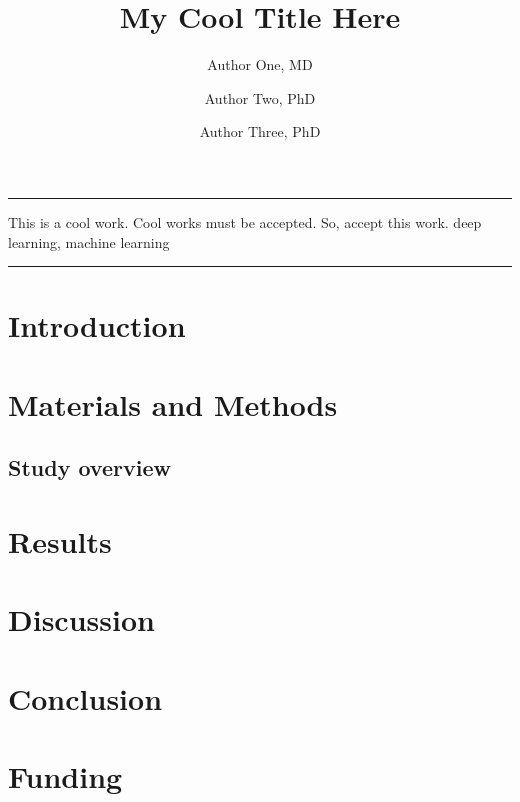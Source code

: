 \documentclass[twocolumn, 8pt]{article}
\title{My Cool Title Here}
\author[1, 2]{Author One, MD}
\author[2]{Author Two, PhD}
\author[1]{Author Three, PhD}
\affil[1]{Institution One, Country;}
\affil[2]{Institution Two, Country}
\date{}
\begin{document}
\par\noindent\rule[-7pt]{15.5cm}{0.2em}
\begin{strip}
    \begin{minipage}{.88\textwidth}
        \maketitle
        \small
        \abstractSection
        {This is a cool work. Cool works must be accepted. So, accept this work.} %
        {} %
        {} %
        {} %
        {} %
        {deep learning, machine learning} %
        
        \par\noindent\rule[-7pt]{15.5cm}{0.2em}
        \hspace{2cm}
    \end{minipage}
\end{strip}


\section*{Introduction}
\lipsum[3-4] \cite{he2016deep}

\section*{Materials and Methods}
\subsection*{Study overview}
\lipsum[3-5]

\section*{Results}
\lipsum[3-4]

\section*{Discussion}
\lipsum[3-6]

\section*{Conclusion}
\lipsum[3-4]

\section*{Funding}
\lipsum[3-4]


{\footnotesize }
\end{document}
